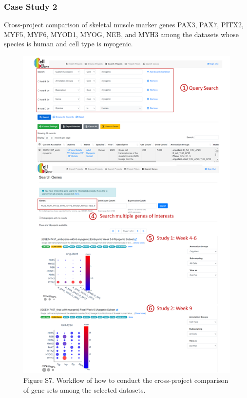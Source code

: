 \documentclass[
]{book}
\begin{document}
\hypertarget{case-study-2}{%
\subsubsection{Case Study 2}\label{case-study-2}}

Cross-project comparison of skeletal muscle marker genes PAX3, PAX7, PITX2, MYF5, MYF6, MYOD1, MYOG, NEB, and MYH3 among the datasets whose species is human and cell type is myogenic.

\begin{figure}
\centering
\includegraphics{figures/s7.png}
\caption{Figure S7. Workflow of how to conduct the cross-project comparison of gene sets among the selected datasets.}
\end{figure}
\end{document}

